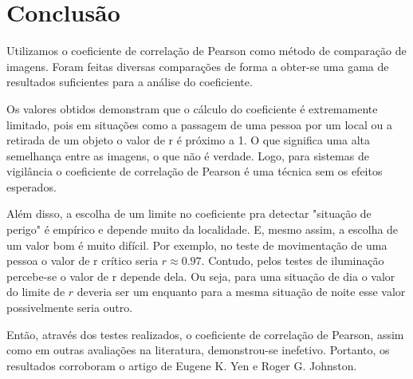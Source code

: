 \documentclass[10pt,a4paper]{article}
\begin{document}
\newpage

\section{Conclusão}
Utilizamos o coeficiente de correlação de Pearson  
como método de comparação de imagens. Foram feitas diversas
comparações de forma a obter-se uma gama de resultados suficientes
para a análise do coeficiente.

Os valores obtidos demonstram que o cálculo do coeficiente é
extremamente limitado, pois em situações como a passagem de uma pessoa
por um local ou a retirada de um objeto o valor de r é próximo a 1. O
que significa uma alta semelhança entre as imagens, o que não é
verdade. Logo, para sistemas de vigilância o coeficiente de correlação
de Pearson é uma técnica sem os efeitos esperados.

Além disso, a escolha de um limite no coeficiente pra detectar "situação de
perigo" é empírico e depende muito da localidade. E, mesmo assim, a
escolha de um valor bom é muito difícil. Por exemplo, no teste de
movimentação de uma pessoa o valor de r crítico seria $r \approx0.97$.
Contudo, pelos testes de iluminação percebe-se o valor de r depende dela.
Ou seja, para uma situação de dia o valor do limite de $r$ deveria ser um
enquanto para a mesma situação de noite esse valor possivelmente seria outro.
 
Então, através dos testes realizados, o coeficiente de correlação de Pearson, assim como em outras
avaliações na literatura, demonstrou-se inefetivo. Portanto, os
resultados corroboram o artigo de Eugene K. Yen e
Roger G. Johnston.





\begin{small}
  
\end{small}
\end{document}
